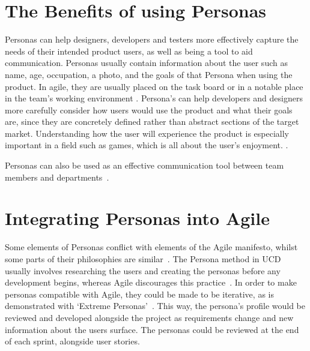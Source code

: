 \documentclass{scrartcl}
\begin{document}
\section{The Benefits of using Personas}
Personas can help designers, developers and testers more effectively capture the needs of their intended product users, as well as being a tool to aid communication. Personas usually contain information about the user such as name, age, occupation, a photo, and the goals of that Persona when using the product. In agile, they are usually placed on the task board or in a notable place in the team's working environment \cite{}. Persona's can help developers and designers more carefully consider how users would use the product and what their goals are, since they are concretely defined rather than abstract sections of the target market. Understanding how the user will experience the product is especially important in a field such as games, which is all about the user's enjoyment. \cite{}.

Personas can also be used as an effective communication tool between team members and departments~\cite{}.


\section{Integrating Personas into Agile}
Some elements of Personas conflict with elements of the Agile manifesto, whilst some parts of their philosophies are similar~\cite{haikara:extending, chaimberlain:framework}. The Persona method in UCD usually involves researching the users and creating the personas before any development begins, whereas Agile discourages this practice~\cite{chaimberlain:framework}. In order to make personas compatible with Agile, they could be made to be iterative, as is demonstrated with `Extreme Personas'~\cite{wolkerstorfer:probing}. This way, the persona's profile would be reviewed and developed alongside the project as requirements change and new information about the users surface. The personas could be reviewed at the end of each sprint, alongside user stories.
\end{document}
